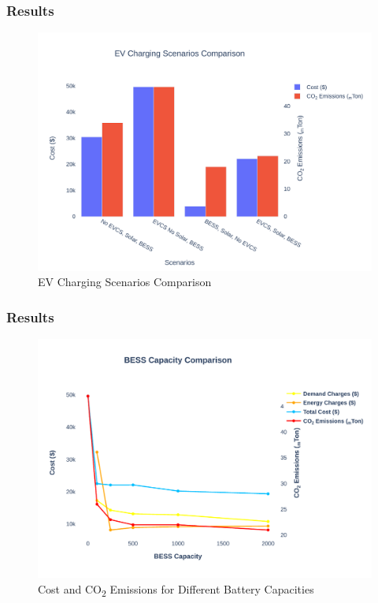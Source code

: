 \documentclass[aspectratio=169, 8 pt]{beamer}
\begin{document}
		\begin{frame}
			\frametitle{Results}
			\begin{figure}
				\centering
				\includegraphics[width=0.7\linewidth]{Fig/mg_scene_comparison}
				\caption{EV Charging Scenarios Comparison}
				\label{fig:mgscenecomparison}
			\end{figure}
		\end{frame}
	
		\begin{frame}
			\frametitle{Results}
			\begin{figure}
				\centering
				\includegraphics[width=0.7\linewidth]{Fig/bess_capacity_comparison}
				\caption{Cost and CO\textsubscript{2} Emissions for Different Battery Capacities}
				\label{fig:besscapacitycomparison}
			\end{figure}
		\end{frame}
	
\end{document}
